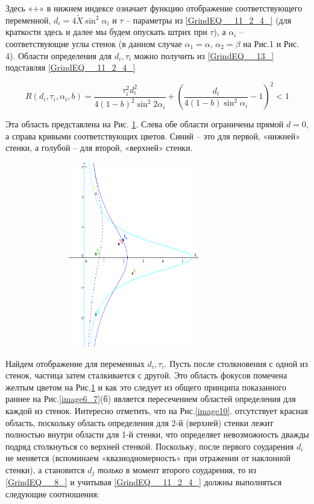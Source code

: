 \documentclass[a4paper]{article}
\begin{document}
Здесь «$+$» в нижнем индексе означает функцию отображение соответствующего переменной, $d_{i} =4\tilde{X}\sin ^{2} \alpha _{i} $ и $\tau $ -- параметры из \eqref{GrindEQ__11_2_4_}  (для краткости здесь и далее мы будем опускать штрих при $\tau $), а $\alpha _{i} $ -- соответствующие углы стенок (в данном случае $\alpha _{1} =\alpha$, $\alpha _{2} =\beta $ на Рис.1 и Рис. 4). Области определения для $d_{i} ,\tau _{i} $ можно получить из \eqref{GrindEQ__13_} подставляя \eqref{GrindEQ__11_2_4_}

\begin{equation} \label{GrindEQ__21_} R\left(d_{i} ,\tau _{i} ,\alpha _{i} ,b\right)=\frac{\tau _{i} ^{2} d_{i} ^{2} }{4\left(1-b\right)^{2} \sin ^{2} 2\alpha _{i} } +\left(\frac{d_{i} }{4\left(1-b\right) \sin ^{2} \alpha _{i} } -1\right)^{2} <1 \end{equation}

Эта область представлена на Рис. \ref{image11}. Слева обе области ограничены прямой $d=0$, а справа кривыми соответствующих цветов. Синий -- это для первой, «нижней» стенки, а голубой -- для второй, «верхней» стенки.
\begin{figure}[ht]
  \centering
  \includegraphics[width=91.0mm, height=80.7mm, viewport=3mm 4mm 205mm 292mm]{image11}\\
  \caption{}\label{image11}
\end{figure}

Найдем  отображение для переменных $d_{i} ,\tau _{i} $. Пусть после столкновения с одной из стенок, частица затем сталкивается с другой. Это область фокусов помечена желтым цветом на Рис.\ref{image11} и как это следует из общего принципа показанного раннее на Рис.\ref{image6_7}(б) является пересечением областей определения для каждой из стенок. Интересно отметить, что на Рис.\ref{image10}. отсутствует красная область, поскольку область определения для 2-й (верхней) стенки лежит полностью внутри области для 1-й стенки, что определяет невозможность дважды подряд столкнуться со верхней стенкой. Поскольку, после первого соударения $d_{i} $ не меняется (вспоминаем «квазиодномерность» при отражении от наклонной стенки), а становится $d_{j} $ \textit{только} в момент второго соударения, то из \eqref{GrindEQ__8_} и учитывая \eqref{GrindEQ__11_2_4_} должны выполняться следующие соотношения:
\end{document}
